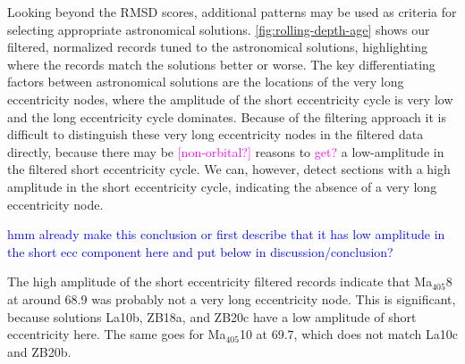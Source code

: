 \documentclass[draft]{agujournal2019}
\newcommand{\rez}{\textcolor{magenta}}
\newcommand{\ijk}{\textcolor{blue}}
\newcommand{\ma}[1]{Ma\(_{405}\)#1}
\begin{document}
Looking beyond the \gls{RMSD} scores, additional patterns may be used as criteria for selecting appropriate astronomical solutions.
\cref{fig:rolling-depth-age} shows our filtered, normalized records tuned to the astronomical solutions, highlighting where the records match the solutions better or worse.
The key differentiating factors between astronomical solutions are the locations of the very long eccentricity nodes, where the amplitude of the short eccentricity cycle is very low and the long eccentricity cycle dominates.
Because of the filtering approach it is difficult to distinguish these very long eccentricity nodes in the filtered data directly, because there may be \rez{[non-orbital?]} reasons to \rez{get?} a low-amplitude in the filtered short eccentricity cycle.
We can, however, detect sections with a high amplitude in the short eccentricity cycle, indicating the absence of a very long eccentricity node.

\ijk{hmm already make this conclusion or first describe that it has low amplitude in the short ecc component here and put below in discussion/conclusion?}

The high amplitude of the short eccentricity filtered records indicate that \ma{8} at around \qty{68.9}{\millionyearago} was probably not a very long eccentricity node.
This is significant, because solutions La10b, ZB18a, and ZB20c have a low amplitude of short eccentricity here.
The same goes for \ma{10} at \qty{69.7}{\millionyearago}, which does not match La10c and ZB20b.
\end{document}
